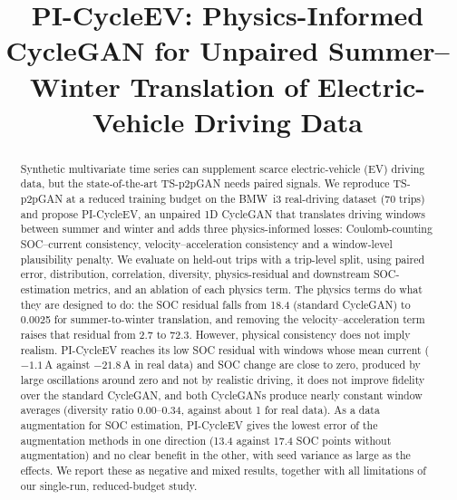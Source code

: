 \documentclass[conference]{IEEEtran}
\begin{document}
\title{PI-CycleEV: Physics-Informed CycleGAN for Unpaired Summer--Winter Translation of Electric-Vehicle Driving Data}

\author{
}

\maketitle

\begin{abstract}
Synthetic multivariate time series can supplement scarce electric-vehicle (EV) driving data, but the state-of-the-art TS-p2pGAN needs paired signals. We reproduce TS-p2pGAN at a reduced training budget on the BMW~i3 real-driving dataset (70 trips) and propose PI-CycleEV, an unpaired 1D CycleGAN that translates driving windows between summer and winter and adds three physics-informed losses: Coulomb-counting SOC--current consistency, velocity--acceleration consistency and a window-level plausibility penalty. We evaluate on held-out trips with a trip-level split, using paired error, distribution, correlation, diversity, physics-residual and downstream SOC-estimation metrics, and an ablation of each physics term. The physics terms do what they are designed to do: the SOC residual falls from 18.4 (standard CycleGAN) to 0.0025 for summer-to-winter translation, and removing the velocity--acceleration term raises that residual from 2.7 to 72.3. However, physical consistency does not imply realism. PI-CycleEV reaches its low SOC residual with windows whose mean current ($-1.1$\,A against $-21.8$\,A in real data) and SOC change are close to zero, produced by large oscillations around zero and not by realistic driving, it does not improve fidelity over the standard CycleGAN, and both CycleGANs produce nearly constant window averages (diversity ratio 0.00--0.34, against about 1 for real data). As a data augmentation for SOC estimation, PI-CycleEV gives the lowest error of the augmentation methods in one direction (13.4 against 17.4 SOC points without augmentation) and no clear benefit in the other, with seed variance as large as the effects. We report these as negative and mixed results, together with all limitations of our single-run, reduced-budget study.
\end{abstract}
\end{document}
